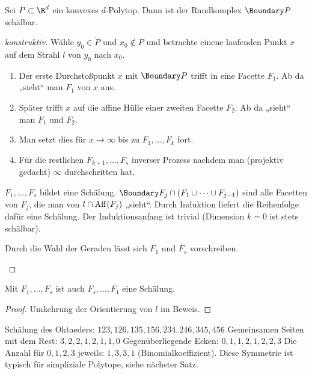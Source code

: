 \begin{st}
    Sei $P \subset \R^d$ ein konvexes $d$-Polytop.
    Dann ist der Randkomplex $\Boundary P$ schälbar.
    \begin{proof}[konstruktiv]
        Wähle $y_0 \in \mathring P$ und $x_0 \not\in P$ und betrachte einene laufenden Punkt $x$ auf dem Strahl $l$ von $y_0$ nach $x_0$.
        \begin{enumerate}[1.]
            \item
                Der erste Durchstoßpunkt $x$ mit $\Boundary P$ trifft in eine Facette $F_1$.
                Ab da „sieht“ man $F_1$ von $x$ aus.
            \item
                Später trifft $x$ auf die affine Hülle einer zweiten Facette $F_2$.
                Ab da „sieht“ man $F_1$ und $F_2$.
            \item
                Man setzt dies für $x \to \infty$ bis zu $F_1, \dotsc, F_k$ fort.
            \item
                Für die restlichen $F_{k+1}, \dotsc, F_s$ inverser Prozess nachdem man (projektiv gedacht) $\infty$ durchschritten hat.
        \end{enumerate}
        $F_1, \dotsc, F_s$ bildet eine Schälung.
        $\Boundary F_j \cap (F_1 \cup \dotsb \cup F_{j-1})$ sind alle Facetten von $F_j$, die man von $l \cap \operatorname { Aff }(F_j)$ „sieht“. 
        Durch Induktion liefert die Reihenfolge dafür eine Schälung.
        Der Induktionsanfang ist trivial (Dimension $k = 0$ ist stets schälbar).
        \begin{note}
            Durch die Wahl der Geraden lässt sich $F_1$ und $F_s$ vorschreiben.
        \end{note}
    \end{proof}
\end{st}

\begin{kor}
    Mit $F_1, \dotsc, F_s$ ist auch $F_s, \dotsc, F_1$ eine Schälung.
    \begin{proof}
        Umkehrung der Orientierung von $l$ im Beweis.
    \end{proof}
\end{kor}

\begin{ex}
    Schälung des Oktaeders:
    \begin{math}
        123, 126, 135, 156, 234, 246, 345, 456
    \end{math}
    Gemeinsamen Seiten mit dem Rest:
    \begin{math}
        3, 2, 2, 1, 2, 1, 1, 0
    \end{math}
    Gegenüberliegende Ecken:
    \begin{math}
        0, 1, 1, 2, 1, 2, 2, 3
    \end{math}
    Die Anzahl für $0, 1, 2, 3$ jeweils: $1, 3, 3, 1$ (Binomialkoeffizient).
    Diese Symmetrie ist typisch für simpliziale Polytope, siehe nächster Satz.
\end{ex}
